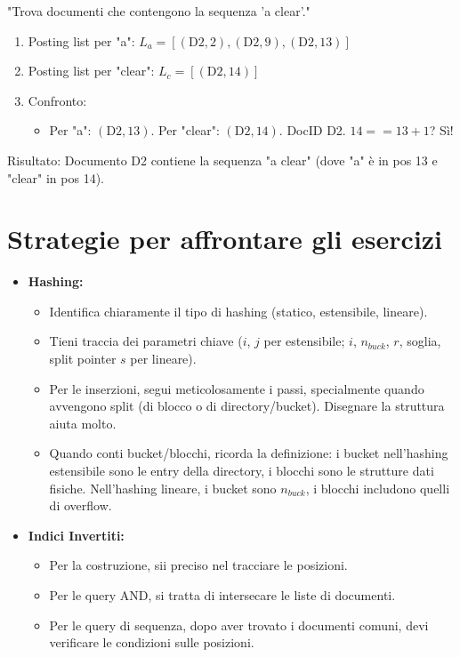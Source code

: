 "Trova documenti che contengono la sequenza 'a clear'."
\begin{enumerate}
    \item Posting list per "a": $L_a = [(\text{D2},2), (\text{D2},9), (\text{D2},13)]$
    \item Posting list per "clear": $L_c = [(\text{D2},14)]$
    \item Confronto:
    \begin{itemize}
        \item Per "a": $(\text{D2},13)$. Per "clear": $(\text{D2},14)$. DocID D2. $14 == 13+1$? Sì!
    \end{itemize}
\end{enumerate}
Risultato: Documento D2 contiene la sequenza "a clear" (dove "a" è in pos 13 e "clear" in pos 14).

\section{Strategie per affrontare gli esercizi}
\begin{itemize}
    \item \textbf{Hashing:}
    \begin{itemize}
        \item Identifica chiaramente il tipo di hashing (statico, estensibile, lineare).
        \item Tieni traccia dei parametri chiave ($i$, $j$ per estensibile; $i$, $n_{buck}$, $r$, soglia, split pointer $s$ per lineare).
        \item Per le inserzioni, segui meticolosamente i passi, specialmente quando avvengono split (di blocco o di directory/bucket). Disegnare la struttura aiuta molto.
        \item Quando conti bucket/blocchi, ricorda la definizione: i bucket nell'hashing estensibile sono le entry della directory, i blocchi sono le strutture dati fisiche. Nell'hashing lineare, i bucket sono $n_{buck}$, i blocchi includono quelli di overflow.
    \end{itemize}
    \item \textbf{Indici Invertiti:}
    \begin{itemize}
        \item Per la costruzione, sii preciso nel tracciare le posizioni.
        \item Per le query AND, si tratta di intersecare le liste di documenti.
        \item Per le query di sequenza, dopo aver trovato i documenti comuni, devi verificare le condizioni sulle posizioni.
    \end{itemize}
\end{itemize}

